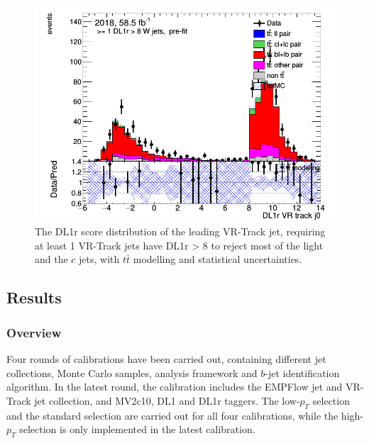\documentclass[letterpaper,12pt]{article}
\begin{document}
\begin{figure}[!h]
    \centering
    \begin{minipage}[b]{.45\textwidth}
\centering
\includegraphics[width=1\textwidth]{3bplots/3bplots.png}
\end{minipage}
	\caption{The DL1r score distribution of the leading VR-Track jet, 
	requiring at least 1 VR-Track jets have DL1r > 8 to reject most of 
	the light and the $c$ jets, with $t\bar{t}$ modelling and statistical uncertainties. }
    \label{fig:3bplots}
\end{figure}


\subsection{Results}
\label{result}


\subsubsection{Overview}
Four rounds of calibrations have been carried out, containing different 
jet collections, Monte Carlo samples, analysis framework 
and $b$-jet identification algorithm. 
In the latest round, 
the calibration includes the EMPFlow jet and VR-Track jet collection, 
and MV2c10, DL1 and DL1r taggers. The low-$p_T$ 
selection and the standard selection are carried out for all four 
calibrations, while the high-$p_T$ selection is only implemented 
in the latest calibration. 
\end{document}
